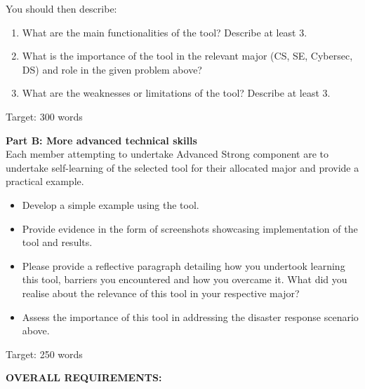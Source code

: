 \documentclass[a4paper, 11pt]{report}
\begin{document}
\vspace{4ex}

You should then describe:
\begin{enumerate}
    \item What are the main functionalities of the tool? Describe at least 3.
    \item What is the importance of the tool in the relevant major (CS, SE, Cybersec, DS) and role in the given problem above?
    \item What are the weaknesses or limitations of the tool? Describe at least 3.
\end{enumerate}
Target: 300 words

\vspace{4ex}

\textbf{Part B: More advanced technical skills}\\

Each member attempting to undertake Advanced Strong component are to undertake self-learning of the selected tool for their allocated major and provide a practical example.

\begin{itemize}
    \item Develop a simple example using the tool.
    \item Provide evidence in the form of screenshots showcasing implementation of the tool and results.
    \item Please provide a reflective paragraph detailing how you undertook learning this tool, barriers you encountered and how you overcame it. What did you realise about the relevance of this tool in your respective major?
    \item Assess the importance of this tool in addressing the disaster response scenario above.
\end{itemize}

Target: 250 words

\vspace{6ex}

\textbf{OVERALL REQUIREMENTS:}
\end{document}
